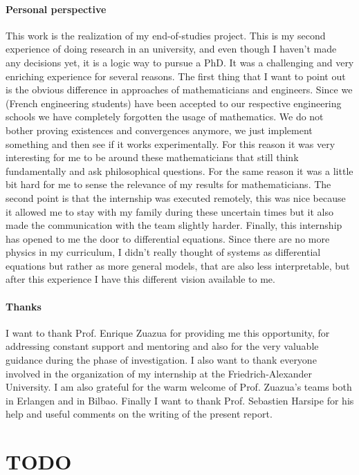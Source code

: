 \documentclass[12pt, letterpaper]{article}
\begin{document}
\paragraph{Personal perspective} This work is the realization of my end-of-studies project. 
This is my second experience of doing research in an university, and even though I haven’t made any decisions yet, it is a logic way to pursue a PhD. 
It was a challenging and very enriching experience for several reasons. 
The first thing that I want to point out is the obvious difference in approaches of mathematicians and engineers. Since we (French engineering students) have been accepted to our respective engineering schools we have completely forgotten the usage of mathematics. 
We do not bother proving existences and convergences anymore, we just implement something and then see if it works experimentally. 
For this reason it was very interesting for me to be around these mathematicians that still think fundamentally and ask philosophical questions. 
For the same reason it was a little bit hard for me to sense the relevance of my results for mathematicians.
The second point is that the internship was executed remotely, this was nice because it allowed me to stay with my family during these uncertain times but it also made the communication with the team slightly harder.
Finally, this internship has opened to me the door to differential equations. 
Since there are no more physics in my curriculum, I didn't really thought of systems as differential equations but rather as more general models, that are also less interpretable, but after this experience I have this different vision available to me.


\paragraph{Thanks} I want to thank Prof. Enrique Zuazua for providing me this opportunity, for addressing constant support and mentoring and also for the very valuable guidance during the phase of investigation. 
I also want to thank everyone involved in the organization of my internship at the Friedrich-Alexander University. 
I am also grateful for the warm welcome of Prof. Zuazua's teams both in Erlangen and in Bilbao. 
Finally I want to thank Prof. Sebastien Harsipe for his help and useful comments on the writing of the present report.

\section*{TODO}
\end{document}
